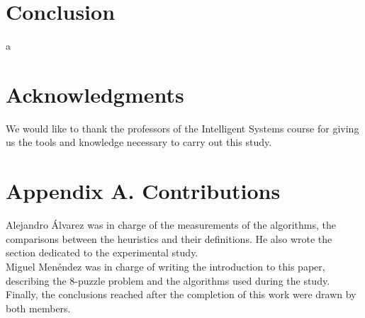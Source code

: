 \documentclass[runningheads]{llncs}
\begin{document}
\section{Conclusion}
a
\section*{Acknowledgments}
We would like to thank the professors of the Intelligent Systems course for giving us the tools and knowledge necessary to carry out this study.
\section*{Appendix A. Contributions}
Alejandro Álvarez was in charge of the measurements of the algorithms, the comparisons between the heuristics and their definitions. He also wrote the section dedicated to the experimental study.
\\
Miguel Menéndez was in charge of writing the introduction to this paper, describing the 8-puzzle problem and the algorithms used during the study.
\\
Finally, the conclusions reached after the completion of this work were drawn by both members.

%
%
%
%
%
%
\end{document}
